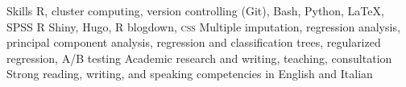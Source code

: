 
\begin{rubric}{Skills}
R, cluster computing, version controlling (Git), Bash, Python, \LaTeX, SPSS
R Shiny, Hugo, R blogdown, \textsc{css}
Multiple imputation, regression analysis, principal component analysis, regression and classification trees, regularized regression, A/B testing
\entry*[Miscellaneous]
Academic research and writing, teaching, consultation
\entry*[Languages]
	Strong reading, writing, and speaking competencies in English and Italian
\end{rubric}

